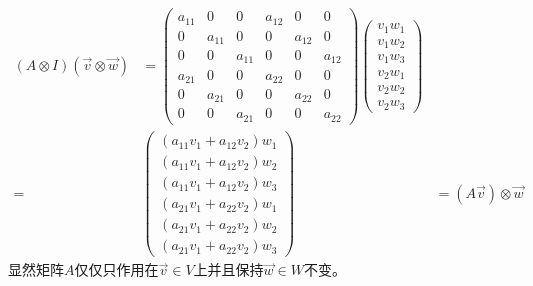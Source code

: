 \documentclass[a4paper,11pt]{article}
\begin{document}
    \begin{equation}
        \begin{aligned}
            (A \otimes I)(\vec{v} \otimes \vec{w}) &=\left(\begin{array}{ccc|ccc}
            a_{11} & 0 & 0 & a_{12} & 0 & 0 \\
            0 & a_{11} & 0 & 0 & a_{12} & 0 \\
            0 & 0 & a_{11} & 0 & 0 & a_{12} \\
            \hline a_{21} & 0 & 0 & a_{22} & 0 & 0 \\
            0 & a_{21} & 0 & 0 & a_{22} & 0 \\
            0 & 0 & a_{21} & 0 & 0 & a_{22}
            \end{array}\right)\left(\begin{array}{c}
            v_{1} w_{1} \\
            v_{1} w_{2} \\
            v_{1} w_{3} \\
            \hline v_{2} w_{1} \\
            v_{2} w_{2} \\
            v_{2} w_{3}
            \end{array}\right) \\
            =&\left(\begin{array}{c}
            \left(a_{11} v_{1}+a_{12} v_{2}\right) w_{1} \\
            \left(a_{11} v_{1}+a_{12} v_{2}\right) w_{2} \\
            \left(a_{11} v_{1}+a_{12} v_{2}\right) w_{3} \\
            \hline\left(a_{21} v_{1}+a_{22} v_{2}\right) w_{1} \\
            \left(a_{21} v_{1}+a_{22} v_{2}\right) w_{2} \\
            \left(a_{21} v_{1}+a_{22} v_{2}\right) w_{3}
            \end{array}\right) &=(A \vec{v}) \otimes \vec{w}
            \end{aligned}
    \end{equation}
    显然矩阵$A$仅仅只作用在$\vec{v}\in V$上并且保持$\vec{w}\in W$不变。
\end{document}
